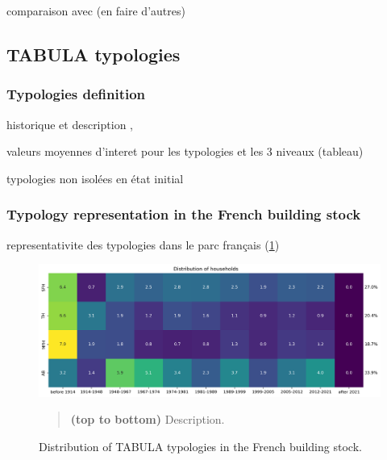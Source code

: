 \documentclass[11pt]{article}
\begin{document}
        comparaison avec \textcite{pomianowski_method_2023} (en faire d'autres)


    \clearpage
    \subsection{TABULA typologies} %
    \label{sub:tabula_typologies}
    
        \subsubsection{Typologies definition} %
        \label{ssub:typologies_definition}
        
        historique et description
        \cite{pouget_consultants_batiments_2015}, \cite{loga_tabula_2016}

        valeurs moyennes d'interet pour les typologies et les 3 niveaux (tableau)

        typologies non isolées en état initial 

        \subsubsection{Typology representation in the French building stock} %
        \label{ssub:typologies_distribution}
        
        representativite des typologies dans le parc français (\ref{fig:tab_stock})

        \begin{figure}[ht]
            \centering
            \includegraphics[width=0.99\columnwidth]{figures/bgc_distribution_tabula_households_ponderated.png}
            \caption{\label{fig:tab_stock} Distribution of TABULA typologies in the French building stock.}
            \begin{quote}
                \vspace{-2mm}
                \small\noindent
                \textbf{(top to bottom)} Description.  
              \end{quote}
        \end{figure}
\end{document}
